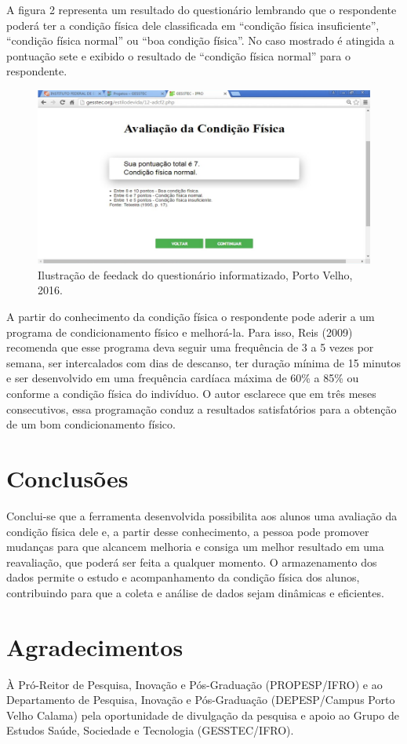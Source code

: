 \documentclass[article,12pt,onesidea,4paper,english,brazil]{abntex2}
\begin{document}
	A figura 2 representa um resultado do questionário lembrando que o respondente poderá ter a condição física dele classificada em “condição física insuficiente”, “condição física normal” ou “boa condição física”. No caso mostrado é atingida a pontuação sete e exibido o resultado de “condição física normal” para o respondente.
	
	\begin{figure}[h]
		\centering
		\includegraphics[width=0.4\linewidth]{pip13-2.png}
		\caption{Ilustração de feedack do questionário informatizado, Porto Velho, 2016.}
	\end{figure}

A partir do conhecimento da condição física o respondente pode aderir a um programa de condicionamento físico e melhorá-la. Para isso, Reis (2009) recomenda que esse programa deva seguir uma frequência de 3 a 5 vezes por semana, ser intercalados com dias de descanso, ter duração mínima de 15 minutos e ser desenvolvido em uma frequência cardíaca máxima de 60\% a 85\% ou conforme a condição física do indivíduo. O autor esclarece que em três meses consecutivos, essa programação conduz a resultados satisfatórios para a obtenção de um bom condicionamento físico.
	
	\section*{Conclusões}
	
	Conclui-se que a ferramenta desenvolvida possibilita aos alunos uma avaliação da condição física dele e, a partir desse conhecimento, a pessoa pode promover mudanças para que alcancem melhoria e consiga um melhor resultado em uma reavaliação, que poderá ser feita a qualquer momento. O armazenamento dos dados permite o estudo e acompanhamento da condição física dos alunos, contribuindo para que a coleta e análise de dados sejam dinâmicas e eficientes.
	
	\section*{Agradecimentos}
	À Pró-Reitor de Pesquisa, Inovação e Pós-Graduação (PROPESP/IFRO) e ao Departamento de Pesquisa, Inovação e Pós-Graduação (DEPESP/Campus Porto Velho Calama) pela oportunidade de divulgação da pesquisa e apoio ao Grupo de Estudos Saúde, Sociedade e Tecnologia (GESSTEC/IFRO).
	
\end{document}
